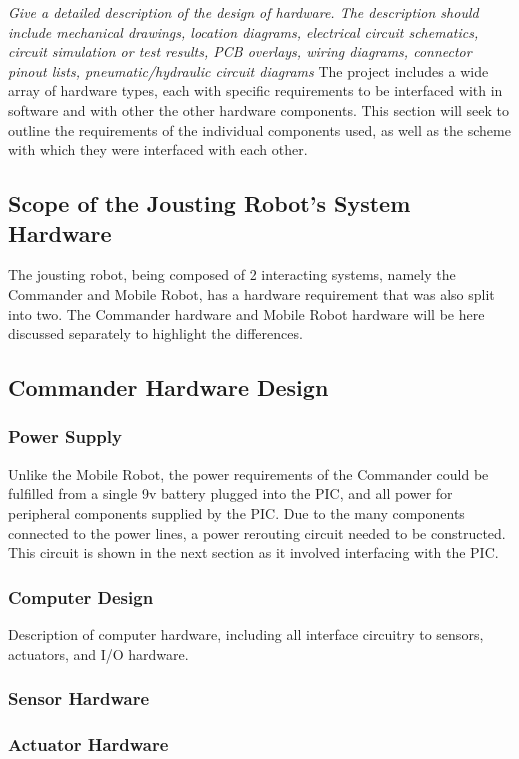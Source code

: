 \documentclass[MTRX3700report.tex]{subfiles}
\begin{document}
  \textit{Give a detailed description of the design of hardware. The description should include mechanical drawings, location diagrams, electrical circuit schematics, circuit simulation or test results, PCB overlays, wiring diagrams, connector pinout lists, pneumatic/hydraulic circuit diagrams}
  The project includes a wide array of hardware types, each with specific requirements to be interfaced with in software and with other the other hardware components. This section will seek to outline the requirements of the individual components used, as well as the scheme with which they were interfaced with each other.

  \subsection{Scope of the Jousting Robot's System Hardware}
  The jousting robot, being composed of 2 interacting systems, namely the Commander and Mobile Robot, has a hardware requirement that was also split into two.
  The Commander hardware and Mobile Robot hardware will be here discussed separately to highlight the differences.
  \subsection{Commander Hardware Design}
    \subsubsection{Power Supply}
    Unlike the Mobile Robot, the power requirements of the Commander could be fulfilled from a single 9v battery plugged into the PIC, and all power for peripheral components supplied by the PIC. Due to the many components connected to the power lines, a power rerouting circuit needed to be constructed. This circuit is shown in the next section as it involved interfacing with the PIC.
    \subsubsection{Computer Design}
    Description of computer hardware, including all interface circuitry to sensors, actuators, and I/O hardware.
    \subsubsection{Sensor Hardware}
    \subsubsection{Actuator Hardware}
\end{document}
